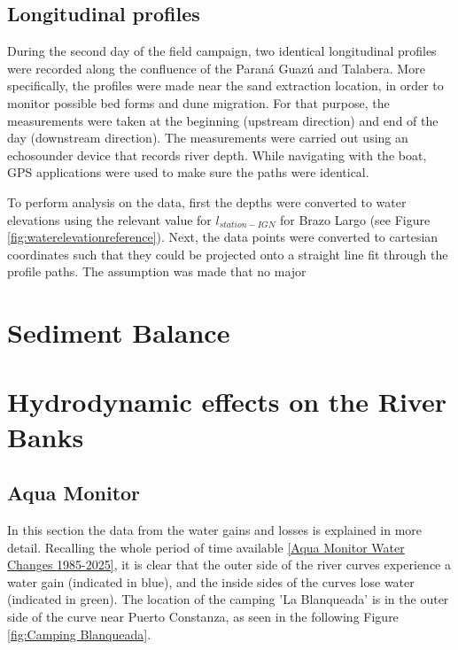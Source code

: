 \subsection{Longitudinal profiles}
During the second day of the field campaign, two identical longitudinal profiles were recorded along the confluence of the Paraná Guazú and Talabera. More specifically, the profiles were made near the sand extraction location, in order to monitor possible bed forms and dune migration. For that purpose, the measurements were taken at the beginning (upstream direction) and end of the day (downstream direction). The measurements were carried out using an echosounder device that records river depth. While navigating with the boat, GPS applications were used to make sure the paths were identical. 

To perform analysis on the data, first the depths were converted to water elevations using the relevant value for $l_{station-IGN}$ for Brazo Largo (see Figure \ref{fig:waterelevationreference}). Next, the data points were converted to cartesian coordinates such that they could be projected onto a straight line fit through the profile paths. The assumption was made that no major 



\section{Sediment Balance}
\label{sec: Sediment Balance}






\section{Hydrodynamic effects on the River Banks}
\subsection{Aqua Monitor}
\label{section:cirtical_location}
In this section the data from the water gains and losses is explained in more detail.
Recalling the whole period of time available \ref{Aqua Monitor Water Changes 1985-2025}, it is clear that the outer side of the river curves experience a water gain (indicated in blue), and the inside sides of the curves lose water (indicated in green). 
The location of the camping 'La Blanqueada' is in the outer side of the curve near Puerto Constanza, as seen in the following Figure \ref{fig:Camping Blanqueada}.

